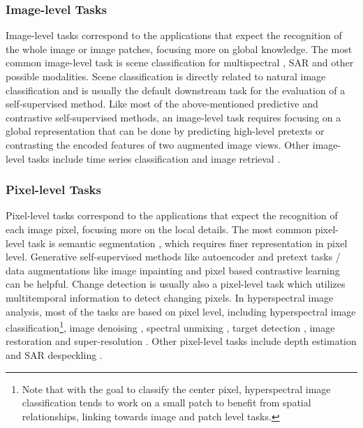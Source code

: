 \documentclass[lettersize,journal]{IEEEtran}
\begin{document}
\subsubsection{Image-level Tasks}

Image-level tasks correspond to the applications that expect the recognition of the whole image or image patches, focusing more on global knowledge. The most common image-level task is scene classification for multispectral \cite{lu2017remote,zhao2020self,tao2020remote,guo2021self}, SAR \cite{ren2021mutual} and other possible modalities. Scene classification is directly related to natural image classification and is usually the default downstream task for the evaluation of a self-supervised method. Like most of the above-mentioned predictive and contrastive self-supervised methods, an image-level task requires focusing on a global representation that can be done by predicting high-level pretexts or contrasting the encoded features of two augmented image views. Other image-level tasks include time series classification \cite{yuan2020self} and image retrieval \cite{walter2020self}.




\subsubsection{Pixel-level Tasks}

Pixel-level tasks correspond to the applications that expect the recognition of each image pixel, focusing more on the local details. The most common pixel-level task is semantic segmentation \cite{Akiva_2021_WACV,li2021semantic,singh2018self,li2021remote}, which requires finer representation in pixel level. Generative self-supervised methods like autoencoder and pretext tasks / data augmentations like image inpainting and pixel based contrastive learning can be helpful. Change detection \cite{zhang2016change,alvarez2020s2,dong2020self,tomenotti2020heterogeneous,cai2021task,chen2021self1,chen2021self2,leenstra2021self,leenstra2021self} is usually also a pixel-level task which utilizes multitemporal information to detect changing pixels. In hyperspectral image analysis, most of the tasks are based on pixel level, including hyperspectral image classification\footnote{Note that with the goal to classify the center pixel, hyperspectral image classification tends to work on a small patch to benefit from spatial relationships, linking towards image and patch level tasks.}\cite{li2021self,kemker2017self,mou2017unsupervised}, image denoising \cite{wang2021self}, spectral unmixing \cite{palsson2022blind}, target detection \cite{yao2021self}, image restoration \cite{imamura2019self} and super-resolution \cite{chen2021hyperspectral,yao2020cross}. Other pixel-level tasks include depth estimation \cite{hermann2020self,madhuanand2021self} and SAR despeckling \cite{yuan2019blind,molini2021speckle2void}.
\end{document}
